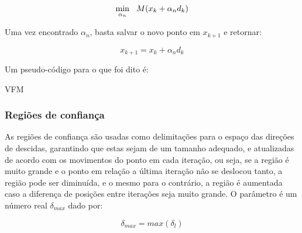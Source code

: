 \begin{equation}
\underset{\alpha_n}{\mathrm{min}} \hspace{0.3cm} M(x_k + \alpha_n d_k)
\end{equation}

Uma vez encontrado \(\alpha_n\), basta salvar o novo ponto em \(x_{k+1}\) e retornar:

\begin{equation}
  x_{k+1} = x_k + \alpha_n d_k
\end{equation}

Um pseudo-código para o que foi dito é:

\vspace{15pt}
\begin{algorithm}[H]
  \SetAlgoLined
  \caption{VFM}
\end{algorithm}
\vspace{15pt}



\subsubsection{Regiões de confiança}
As regiões de confiança são usadas como delimitações para o espaço das direções de descidas,
garantindo que estas sejam de um tamanho adequado, e atualizadas de acordo com os movimentos do
ponto em cada iteração, ou seja, se a região é muito grande e o ponto em relação a última
iteração não se deslocou tanto, a região pode ser diminuída, e o mesmo para o contrário,
a região é aumentada caso a diferença de posições entre iterações seja muito grande. O
parâmetro é um número real \(\delta_{max}\) dado por:

\begin{equation}
  \delta_{max} = max(\delta_l)
\end{equation}

